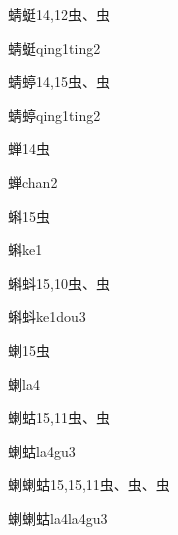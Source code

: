 \begin{Entry}{蜻蜓}{14,12}{⾍、⾍}
  \begin{Phonetics}{蜻蜓}{qing1ting2}
  \end{Phonetics}
\end{Entry}

\begin{Entry}{蜻蝏}{14,15}{⾍、⾍}
  \begin{Phonetics}{蜻蝏}{qing1ting2}
  \end{Phonetics}
\end{Entry}

\begin{Entry}{蝉}{14}{⾍}
  \begin{Phonetics}{蝉}{chan2}
  \end{Phonetics}
\end{Entry}

\begin{Entry}{蝌}{15}{⾍}
  \begin{Phonetics}{蝌}{ke1}
  \end{Phonetics}
\end{Entry}

\begin{Entry}{蝌蚪}{15,10}{⾍、⾍}
  \begin{Phonetics}{蝌蚪}{ke1dou3}
  \end{Phonetics}
\end{Entry}

\begin{Entry}{蝲}{15}{⾍}
  \begin{Phonetics}{蝲}{la4}
  \end{Phonetics}
\end{Entry}

\begin{Entry}{蝲蛄}{15,11}{⾍、⾍}
  \begin{Phonetics}{蝲蛄}{la4gu3}
  \end{Phonetics}
\end{Entry}

\begin{Entry}{蝲蝲蛄}{15,15,11}{⾍、⾍、⾍}
  \begin{Phonetics}{蝲蝲蛄}{la4la4gu3}
  \end{Phonetics}
\end{Entry}

